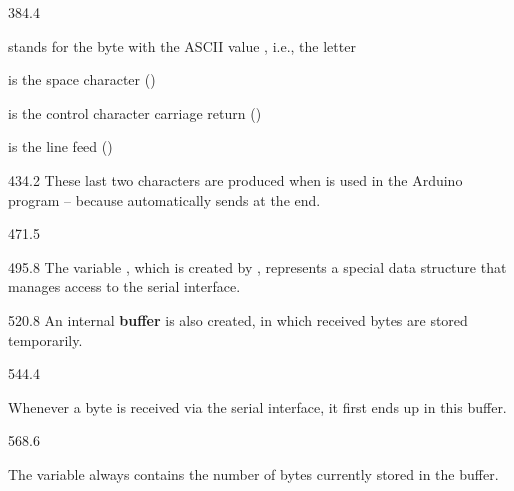 \documentclass{aslab}
\begin{document}
\begin{region}[x=68.7,right=0,pitch=12.3]{384.4}
\begin{dashlist}
\item {} stands for the byte with the ASCII value , i.e.,
  the letter 
\item {} is the space character ()
\item {} is the control character carriage return ()
\item {} is the line feed ()
\end{dashlist}
\end{region}

\begin{region}[x=68.6,right=0,pitch=12.3]{434.2}
These last two characters are produced when  is
used in the Arduino program -- because  automatically sends
\code{\r\n} at the end.
\end{region}

\begin{region}{471.5}
\end{region}

\begin{region}[pitch=12.1]{495.8}
The variable , which is created by ,
represents a special data structure that manages access to the serial
interface.
\end{region}

\begin{region}[pitch=12.1]{520.8}
An internal \textbf{buffer} is also created, in which received bytes are
stored temporarily.
\end{region}

\begin{region}[x=68.7,right=0,pitch=12.5]{544.4}
\begin{dashlist}
\item Whenever a byte is received via the serial interface, it first ends
  up in this buffer.
\end{dashlist}
\end{region}

\begin{region}[x=68.7,right=0,pitch=12.6]{568.6}
\begin{dashlist}
\item The variable  always contains the number of bytes
  currently stored in the buffer.
\end{dashlist}
\end{region}
\end{document}
